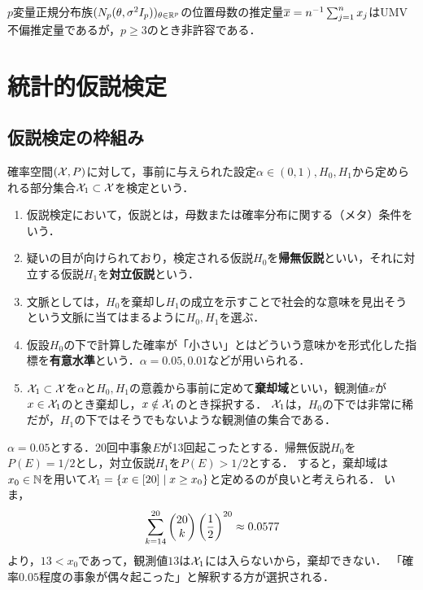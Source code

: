 \documentclass[uplatex,dvipdfmx]{jsreport}
\begin{document}
\begin{tcolorbox}[colframe=ForestGreen, colback=ForestGreen!10!white,breakable,colbacktitle=ForestGreen!40!white,coltitle=black,fonttitle=\bfseries\sffamily,
title=]
    $p$変量正規分布族$(N_p(\theta,\sigma^2I_p))_{\theta\in\mathbb{R}^p}$の位置母数の推定量$\overline{x}=n^{-1}\sum^n_{j=1}x_j$はUMV不偏推定量であるが，$p\ge3$のとき非許容である．
\end{tcolorbox}

\section{統計的仮説検定}

\subsection{仮説検定の枠組み}

\begin{definition}
    確率空間$(\mathcal{X},P)$に対して，事前に与えられた設定$\alpha\in(0,1),H_0,H_1$から定められる部分集合$\mathcal{X}_1\subset\mathcal{X}$を検定という．
    \begin{enumerate}
        \item 仮説検定において，仮説とは，母数または確率分布に関する（メタ）条件をいう．
        \item 疑いの目が向けられており，検定される仮説$H_0$を\textbf{帰無仮説}といい，それに対立する仮説$H_1$を\textbf{対立仮説}という．
        \item 文脈としては，$H_0$を棄却し$H_1$の成立を示すことで社会的な意味を見出そうという文脈に当てはまるように$H_0,H_1$を選ぶ．
        \item 仮設$H_0$の下で計算した確率が「小さい」とはどういう意味かを形式化した指標を\textbf{有意水準}という．$\alpha=0.05,0.01$などが用いられる．
        \item $\mathcal{X}_1\subset\mathcal{X}$を$\alpha$と$H_0,H_1$の意義から事前に定めて\textbf{棄却域}といい，観測値$x$が$x\in\mathcal{X}_1$のとき棄却し，$x\notin\mathcal{X}_1$のとき採択する．
        $\mathcal{X}_1$は，$H_0$の下では非常に稀だが，$H_1$の下ではそうでもないような観測値の集合である．
    \end{enumerate}
\end{definition}

\begin{example}\label{exp-hypothesis-testing}
    $\alpha=0.05$とする．20回中事象$E$が13回起こったとする．帰無仮説$H_0$を$P(E)=1/2$とし，対立仮説$H_1$を$P(E)>1/2$とする．
    すると，棄却域は$x_0\in\mathbb{N}$を用いて$\mathcal{X}_1=\left\{x\in[20]\mid x\ge x_0\right\}$と定めるのが良いと考えられる．
    いま，
    \[\sum^{20}_{k=14}\begin{pmatrix}20\\k\end{pmatrix}\left(\frac{1}{2}\right)^{20}\approx 0.0577\]
    より，$13<x_0$であって，観測値$13$は$\mathcal{X}_1$には入らないから，棄却できない．
    「確率$0.05$程度の事象が偶々起こった」と解釈する方が選択される．
\end{example}
\end{document}
